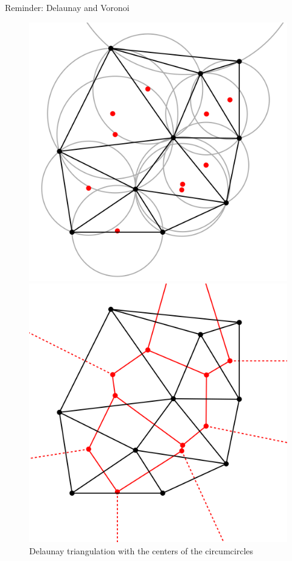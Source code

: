 \documentclass[10pt]{beamer}
\begin{document}
\begin{frame}{Reminder: Delaunay and Voronoi}
  \Large
  \begin{figure}[H]
    \centering
    \begin{minipage}{0.49\textwidth}
        \centering
        \includegraphics[width=\textwidth]{images/Delaunay_circumcircles_centers.svg.png}
        \caption{Delaunay triangulation with the centers of the circumcircles\cite{delaunay-wiki}}
    \end{minipage}\hfill
    \begin{minipage}{0.49\textwidth}
        \centering
        \includegraphics[width=\textwidth]{images/Delaunay_Voronoi.svg.png}

\end{minipage}
\end{figure}
\end{frame}
\end{document}

